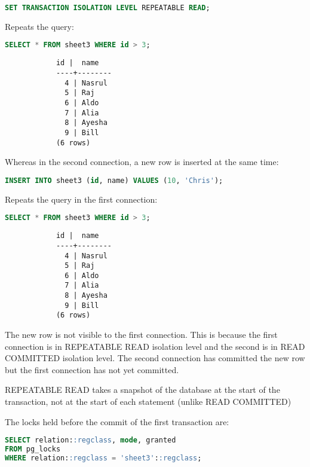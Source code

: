 \documentclass{article}
\begin{document}
\begin{enumerate}[label=\alph*)]
        \begin{lstlisting}[language=sql]
SET TRANSACTION ISOLATION LEVEL REPEATABLE READ;
        \end{lstlisting}

        Repeats the query:
        \begin{lstlisting}[language=sql]
SELECT * FROM sheet3 WHERE id > 3;
        \end{lstlisting}

        \begin{lstlisting}
            id |  name  
            ----+--------
              4 | Nasrul
              5 | Raj
              6 | Aldo
              7 | Alia
              8 | Ayesha
              9 | Bill
            (6 rows)
        \end{lstlisting}

        Whereas in the second connection, a new row is inserted at the same time:
        \begin{lstlisting}[language=sql]
INSERT INTO sheet3 (id, name) VALUES (10, 'Chris');
        \end{lstlisting}

        Repeats the query in the first connection:
        \begin{lstlisting}[language=sql]
SELECT * FROM sheet3 WHERE id > 3;
        \end{lstlisting}

        \begin{lstlisting}
            id |  name  
            ----+--------
              4 | Nasrul
              5 | Raj
              6 | Aldo
              7 | Alia
              8 | Ayesha
              9 | Bill
            (6 rows)
        \end{lstlisting}

        The new row is not visible to the first connection. This is because the first connection is in REPEATABLE READ isolation level and the
        second is in READ COMMITTED isolation level. The second connection has committed the new row but the first connection has not yet committed.

        REPEATABLE READ takes a snapshot of the database at the start of the transaction, not at the start of each statement (unlike READ COMMITTED)
        
        The locks held before the commit of the first transaction are: 
        \begin{lstlisting}[language=sql]
SELECT relation::regclass, mode, granted
FROM pg_locks
WHERE relation::regclass = 'sheet3'::regclass;
        \end{lstlisting}


\end{enumerate}
\end{document}
